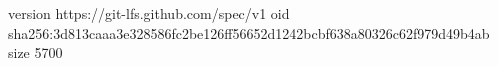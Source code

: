 version https://git-lfs.github.com/spec/v1
oid sha256:3d813caaa3e328586fc2be126ff56652d1242bcbf638a80326c62f979d49b4ab
size 5700
